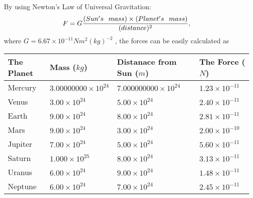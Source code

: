 \documentclass[12pt]{article}
\begin{document}
  
 
 
\noindent{}

By using Newton's Law of Universal Gravitation:
\[
F=G \frac{(Sun's \hspace{0.1in} mass) \times (Planet's \hspace{0.1in} mass)} { (distance)^2},
\]
where
$ G= %
6.67 \times 10^{-11}N m^{2}(kg)^{-2}$ , the forces can be easily calculated as
 
\vspace{0.2in}
 
 
\begin{tabular}{|l|l|l|l|}
\hline
The Planet & Mass ($kg$) & Distanace from Sun ($m$) & The Force ($N$)\\
\hline
Mercury  &
           $ %
3.00000000 \times 10^{24} $   &
             $ %
7.000000000 \times 10^{24} $    & $ %
1.23 \times 10^{-11} $
\\  \hline
Venus    &
           $  %
3.00 \times 10^{24}  $     &
             $ %
5.00 \times 10^{24} $    & $ %
2.40 \times 10^{-11} $
\\  \hline
Earth    &
           $  %
9.00 \times 10^{24}  $     &
             $ %
8.00 \times 10^{24} $    & $ %
2.81 \times 10^{-11} $
\\   \hline
Mars     &
           $  %
9.00 \times 10^{24} $     &
             $ %
3.00 \times 10^{24} $    & $ %
2.00 \times 10^{-10} $
\\   \hline
Jupiter  &
           $  %
7.00 \times 10^{24} $    &
             $ %
5.00 \times 10^{24} $    & $ %
5.60 \times 10^{-11} $
\\  \hline
Saturn   &
           $  %
1.000 \times 10^{25} $    &
             $ %
8.00 \times 10^{24}  $    & $ %
3.13 \times 10^{-11} $
\\  \hline
Uranus   &
           $  %
6.00 \times 10^{24} $    &
             $ %
9.00 \times 10^{24} $    & $ %
1.48 \times 10^{-11} $
\\  \hline
Neptune  &
           $  %
6.00 \times 10^{24} $    &
             $ %
7.00 \times 10^{24} $    & $ %
2.45 \times 10^{-11} $
\\  \hline
 
\end{tabular}
 
 
 
 
 
 
\noindent{}
\end{document}
